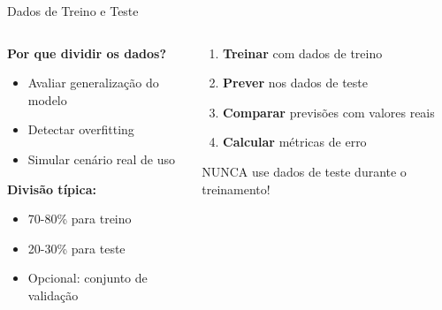 \documentclass[xcolor=dvipsnames,t,aspectratio=169]{beamer} %
\newcommand{\highlight}[1]{{\color{nes_dark_orange} #1}}
\begin{document}
\begin{frame}[c]{Dados de Treino e Teste}
    \begin{columns}[c]
        \begin{column}{0.5\textwidth}
            \textbf{Por que dividir os dados?}
            \begin{itemize}
                \item Avaliar \highlight{generalização} do modelo
                \item Detectar \highlight{overfitting}
                \item Simular cenário real de uso
            \end{itemize}
            
            \vspace{0.5cm}
            \textbf{Divisão típica:}
            \begin{itemize}
                \item 70-80\% para treino
                \item 20-30\% para teste
                \item Opcional: conjunto de validação
            \end{itemize}
        \end{column}
        \begin{column}{0.5\textwidth}
            \begin{display}[Processo]
                \begin{enumerate}
                    \item \textbf{Treinar} com dados de treino
                    \item \textbf{Prever} nos dados de teste
                    \item \textbf{Comparar} previsões com valores reais
                    \item \textbf{Calcular} métricas de erro
                \end{enumerate}
            \end{display}
            
            \begin{attention}[Importante]
                NUNCA use dados de teste durante o treinamento!
            \end{attention}
        \end{column}
    \end{columns}
\end{frame}
\end{document}
